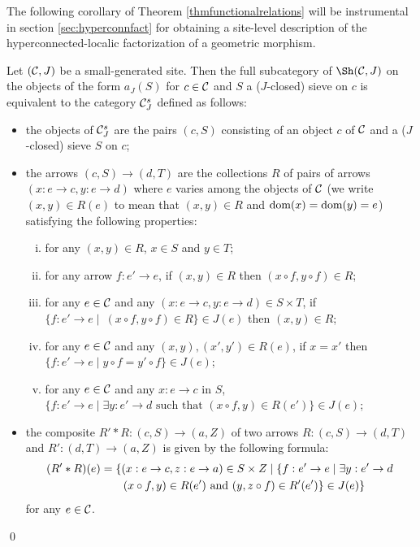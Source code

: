\documentclass[a4paper,12pt]{article}
\begin{document}
The following corollary of Theorem \ref{thmfunctionalrelations} will be instrumental in section \ref{sec:hyperconnfact} for obtaining a site-level description of the hyperconnected-localic factorization of a geometric morphism.

\begin{corollary}\label{corhyperconnectedsieves}
	Let $({\cal C}, J)$ be a small-generated site. Then the full subcategory of $\Sh({\cal C}, J)$ on the objects of the form $a_{J}(S)$ for $c\in {\cal C}$ and $S$ a ($J$-closed) sieve on $c$ is equivalent to the category ${\cal C}_{J}^{s}$ defined as follows: 
	\begin{itemize}
		\item the objects of ${\cal C}_{J}^{s}$ are the pairs $(c, S)$ consisting of an object $c$ of $\cal C$ and a ($J$-closed) sieve $S$ on $c$; 
		
		\item the arrows $(c, S)\to (d, T)$ are the collections $R$ of pairs of arrows $(x:e\to c,y:e\to d)$ where $e$ varies among the objects of $\cal C$ (we write $(x, y)\in R(e)$ to mean that $(x, y)\in R$ and $\textup{dom}(x)=\textup{dom}(y)=e$) satisfying the following properties:
		
		\begin{enumerate}[(i)]
			\item for any $(x,y)\in R$, $x\in S$ and $y\in T$;
			
			\item for any arrow $f:e'\to e$, if $(x,y)\in R$ then $(x\circ f, y\circ f)\in R$; 
			
			\item for any $e\in {\cal C}$ and any $(x:e\to c, y:e\to d)\in S\times T$,  if $\{f:e'\to e \mid\ (x\circ f, y\circ f)\in R\}\in J(e)$ then $(x,y)\in R$; 
			
			\item for any $e\in {\cal C}$ and any $(x, y), (x', y')\in R(e)$, if $x=x'$ then $\{f:e'\to e \mid y\circ f=y'\circ f\}\in J(e)$;
			
			\item for any $e\in {\cal C}$ and any $x:e\to c$ in $S$, $\{f:e'\to e \mid \exists y:e'\to d \text{ such that } (x\circ f, y)\in R(e') \}\in J(e)$;
		\end{enumerate}
		
		\item the composite $R'\ast R:(c, S)\to (a, Z)$ of two arrows $R:(c, S)\to (d, T)$ and $R':(d, T)\to (a, Z)$ is given by the following formula: 
		\begin{equation*}\begin{split}
		(R'\ast R)(e)&=\{(x:e\to c, z:e\to a)\in S\times Z \mid \{f:e'\to e \mid \exists y:e'\to d\, \\
		& \quad\quad(x\circ f, y)\in R(e')\textup{ and } (y, z\circ f)\in R'(e')\}\in J(e) \}
		\end{split}\end{equation*}
		for any $e\in {\cal C}$. 
	\end{itemize} 	
\end{corollary}\qed
\end{document}
